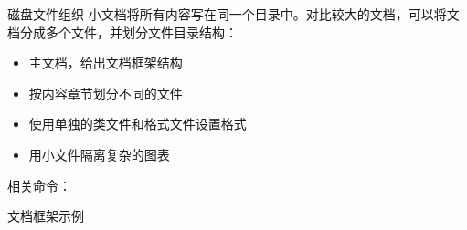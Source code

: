 \begin{frame}[fragile]{磁盘文件组织}
小文档将所有内容写在同一个目录中。对比较大的文档，可以将文档分成多个文件，并划分文件目录结构：
\begin{itemize}
\item 主文档，给出文档框架结构
\item 按内容章节划分不同的文件
\item 使用单独的类文件和格式文件设置格式
\item 用小文件隔离复杂的图表
\end{itemize}\pause
相关命令：
\end{frame}

\begin{frame}[shrink=20]{文档框架示例}
\begin{multicols}{2}
\end{multicols}
\end{frame}
